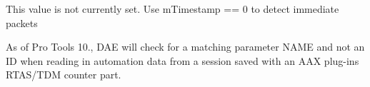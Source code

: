 
\begin{DoxyRefList}
\item[Member \mbox{\hyperlink{a01792_ab6fce0aee8fb08695ac8a112b3c3e7fa}{AAX\+\_\+\+CMidi\+Packet\+::m\+Is\+Immediate}} ]\label{a00879__compatibility_notes000018}%
%
 This value is not currently set. Use {\ttfamily m\+Timestamp == 0} to detect immediate packets  
\item[Member \mbox{\hyperlink{a01908_a37efc08612535de4712bd59445ce8fbf}{AAX\+\_\+\+CParameter$<$ T $>$\+::AAX\+\_\+\+CParameter}} (AAX\+\_\+\+CParam\+ID identifier, const \mbox{\hyperlink{a02332}{AAX\+\_\+\+IString}} \&name, T default\+Value, const AAX\+\_\+\+ITaper\+Delegate$<$ T $>$ \&taper\+Delegate, const AAX\+\_\+\+IDisplay\+Delegate$<$ T $>$ \&display\+Delegate, bool automatable=false)]\label{a00879__compatibility_notes000019}%
%
 As of Pro Tools 10., DAE will check for a matching parameter NAME and not an ID when reading in automation data from a session saved with an AAX plug-\/ins RTAS/\+TDM counter part. 


\end{DoxyRefList}
